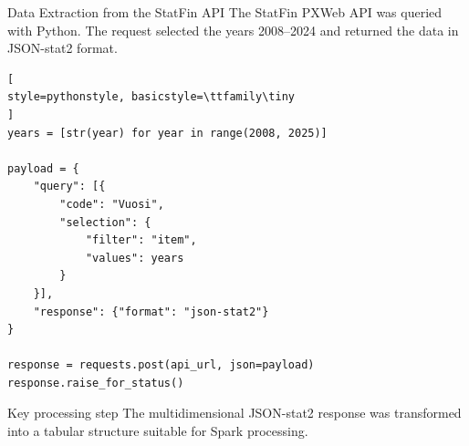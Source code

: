 \documentclass[aspectratio=169]{beamer}
\begin{document}
\begin{frame}[fragile]{Data Extraction from the StatFin API} \small The StatFin PXWeb API was queried with Python. The request selected the years 2008--2024 and returned the data in JSON-stat2 format. \vspace{0.2cm} \begin{lstlisting}[ 
style=pythonstyle, basicstyle=\ttfamily\tiny 
] 
years = [str(year) for year in range(2008, 2025)] 

payload = { 
    "query": [{ 
        "code": "Vuosi", 
        "selection": { 
            "filter": "item", 
            "values": years 
        } 
    }], 
    "response": {"format": "json-stat2"} 
} 

response = requests.post(api_url, json=payload) 
response.raise_for_status() 
\end{lstlisting} 
\vspace{0.15cm} 
\begin{alertblock}{Key processing step} The multidimensional JSON-stat2 response was transformed into a tabular structure suitable for Spark processing. \end{alertblock} 
\end{frame}
\end{document}
